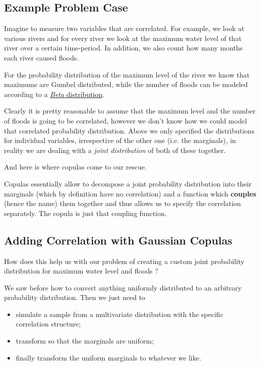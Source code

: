 \subsection{Example Problem Case}\label{example-problem-case}

Imagine to measure two variables that are 
correlated. For example, we look at various rivers and for every river
we look at the maximum water level of that river over a certain
time-period. In addition, we also count how many months each river
caused floods.

For the probability distribution of the maximum level of the river we
know that maximums are Gumbel distributed, while the number of floods
can be modeled according to a
\href{https://en.wikipedia.org/wiki/Beta_distribution}{\emph{Beta}
distribution}.

Clearly it is pretty reasonable to assume that the maximum level and the
number of floods is going to be correlated, however we don't know how
we could model that correlated probability distribution.
Above we only
specified the distributions for individual variables, irrespective of
the other one (i.e. the marginals), in reality we are dealing with a
\emph{joint distribution} of both of these together.

And here is where copulas come to our rescue.

Copulas essentially allow to decompose a joint probability distribution
into their marginals (which by definition have no correlation) and a
function which \textbf{couples} (hence the name) them together and thus allows us
to specify the correlation separately. The copula is just that coupling
function.

\subsection{Adding Correlation with Gaussian Copulas}\label{adding-correlation-with-gaussian-copulas}

How does this help us with our problem of creating a custom joint
probability distribution for maximum water level and floods ?

We saw before how to convert
anything uniformly distributed to an arbitrary probability distribution.
Then we just need to
\begin{itemize}
\tightlist
\item
  simulate a sample from a multivariate distribution with the specific correlation structure;
\item
  transform so that the marginals are uniform;
\item
  finally transform the uniform marginals to whatever we like.
\end{itemize}

